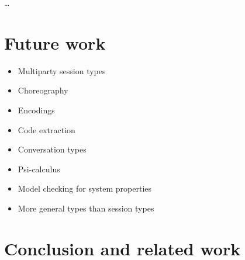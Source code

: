 \documentclass{article}
\begin{document}
\dots

\section{Future work}
\begin{itemize}
\item Multiparty session types
\item Choreography
\item Encodings
\item Code extraction
\item Conversation types
\item Psi-calculus
\item Model checking for system properties
\item More general types than session types
\end{itemize}

\section{Conclusion and related work} \label{sec:conclusion}




\label{lastpage01}
\end{document}
